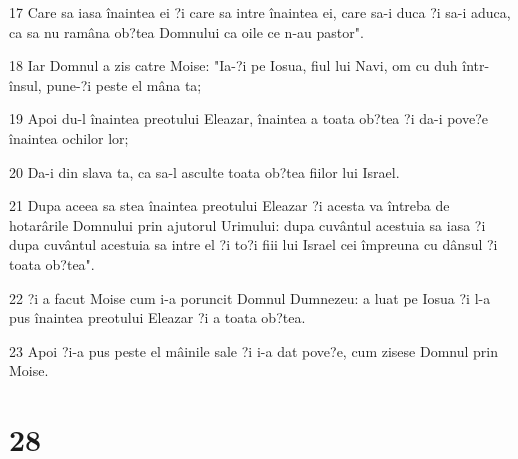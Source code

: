 \par 17 Care sa iasa înaintea ei ?i care sa intre înaintea ei, care sa-i duca ?i sa-i aduca, ca sa nu ramâna ob?tea Domnului ca oile ce n-au pastor".
\par 18 Iar Domnul a zis catre Moise: "Ia-?i pe Iosua, fiul lui Navi, om cu duh într-însul, pune-?i peste el mâna ta;
\par 19 Apoi du-l înaintea preotului Eleazar, înaintea a toata ob?tea ?i da-i pove?e înaintea ochilor lor;
\par 20 Da-i din slava ta, ca sa-l asculte toata ob?tea fiilor lui Israel.
\par 21 Dupa aceea sa stea înaintea preotului Eleazar ?i acesta va întreba de hotarârile Domnului prin ajutorul Urimului: dupa cuvântul acestuia sa iasa ?i dupa cuvântul acestuia sa intre el ?i to?i fiii lui Israel cei împreuna cu dânsul ?i toata ob?tea".
\par 22 ?i a facut Moise cum i-a poruncit Domnul Dumnezeu: a luat pe Iosua ?i l-a pus înaintea preotului Eleazar ?i a toata ob?tea.
\par 23 Apoi ?i-a pus peste el mâinile sale ?i i-a dat pove?e, cum zisese Domnul prin Moise.

\chapter{28}

